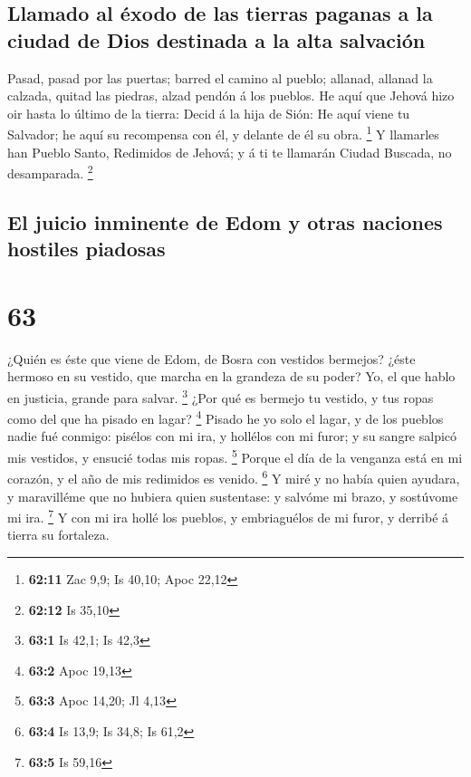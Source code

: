 \hypertarget{llamado-al-uxe9xodo-de-las-tierras-paganas-a-la-ciudad-de-dios-destinada-a-la-alta-salvaciuxf3n}{%
\subsection{Llamado al éxodo de las tierras paganas a la ciudad de Dios
destinada a la alta
salvación}\label{llamado-al-uxe9xodo-de-las-tierras-paganas-a-la-ciudad-de-dios-destinada-a-la-alta-salvaciuxf3n}}

 Pasad, pasad por las puertas; barred el camino al
pueblo; allanad, allanad la calzada, quitad las piedras, alzad pendón á
los pueblos.  He aquí que Jehová hizo oir hasta lo último
de la tierra: Decid á la hija de Sión: He aquí viene tu Salvador; he
aquí su recompensa con él, y delante de él su obra. \footnote{\textbf{62:11}
  Zac 9,9; Is 40,10; Apoc 22,12}  Y llamarles han Pueblo
Santo, Redimidos de Jehová; y á ti te llamarán Ciudad Buscada, no
desamparada. \footnote{\textbf{62:12} Is 35,10}

\hypertarget{el-juicio-inminente-de-edom-y-otras-naciones-hostiles-piadosas}{%
\subsection{El juicio inminente de Edom y otras naciones hostiles
piadosas}\label{el-juicio-inminente-de-edom-y-otras-naciones-hostiles-piadosas}}

\hypertarget{section-62}{%
\section{63}\label{section-62}}

 ¿Quién es éste que viene de Edom, de Bosra con vestidos
bermejos? ¿éste hermoso en su vestido, que marcha en la grandeza de su
poder? Yo, el que hablo en justicia, grande para salvar. \footnote{\textbf{63:1}
  Is 42,1; Is 42,3}  ¿Por qué es bermejo tu vestido, y tus
ropas como del que ha pisado en lagar? \footnote{\textbf{63:2} Apoc
  19,13}  Pisado he yo solo el lagar, y de los pueblos
nadie fué conmigo: pisélos con mi ira, y hollélos con mi furor; y su
sangre salpicó mis vestidos, y ensucié todas mis ropas. \footnote{\textbf{63:3}
  Apoc 14,20; Jl 4,13}  Porque el día de la venganza está
en mi corazón, y el año de mis redimidos es venido. \footnote{\textbf{63:4}
  Is 13,9; Is 34,8; Is 61,2}  Y miré y no había quien
ayudara, y maravilléme que no hubiera quien sustentase: y salvóme mi
brazo, y sostúvome mi ira. \footnote{\textbf{63:5} Is 59,16}
 Y con mi ira hollé los pueblos, y embriaguélos de mi
furor, y derribé á tierra su fortaleza.

